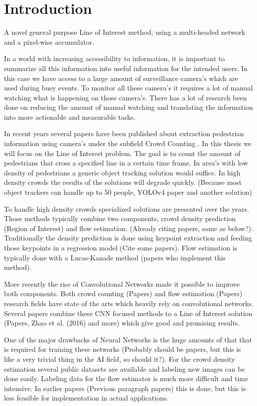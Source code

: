 \chapter{Introduction}

A novel general purpose Line of Interest method, using a multi-headed network and a pixel-wise accumulator.

In a world with increasing accessibility to information, it is important to summarize all this information into useful information for the intended users. In this case we have access to a large amount of surveillance camera's which are used during busy events. To monitor all these camera's it requires a lot of manual watching what is happening on those camera's. There has a lot of research been done on reducing the amount of manual watching and translating the information into more actionable and measurable tasks.

In recent years several papers have been published about extraction pedestrian information using camera's under the subfield Crowd Counting \cite{Chan2008, leibe_crossing-line_2016, wang2020nwpu, li2018csrnet, Fang2019, Liu2019}. In this thesis we will focus on the Line of Interest problem. The goal is to count the amount of pedestrians that cross a specified line in a certain time frame. In area's with low density of pedestrians a generic object tracking solution would suffice. In high density crowds the results of the solutions will degrade quickly. (Because most object trackers can handle up to 50 people, YOLOv4 paper and another solution)

To handle high density crowds specialized solutions are presented over the years. Those methods typically combine two components, crowd density prediction (Region of Interest) and flow estimation. (Already citing papers, same as below?). Traditionally the density prediction is done using keypoint extraction and feeding those keypoints in a regression model (Cite some papers). Flow estimation is typically done with a Lucas-Kanade method (papers who implement this method).

More recently the rise of Convolutional Networks made it possible to improve both components. Both crowd counting (Papers) and flow estimation (Papers) research fields have state of the arts which heavily rely on convolutional networks. Several papers combine these CNN focused methods to a Line of Interest solution (Papers, Zhao et al. (2016) and more) which give good and promising results.

One of the major drawbacks of Neural Networks is the huge amounts of that that is required for training these networks (Probably should be papers, but this is like a very trivial thing in the AI field, so should it?). For the crowd density estimation several public datasets are available and labeling new images can be done easily. Labeling data for the flow estimator is much more difficult and time intensive.  In earlier papers (Previous paragraph papers) this is done, but this is less feasible for implementation in actual applications.

